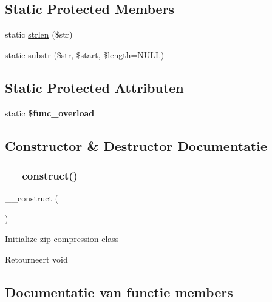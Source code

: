 \subsection*{Static Protected Members}
\begin{DoxyCompactItemize}
\item 
static \mbox{\hyperlink{class_c_i___zip_a4c29a687d4ed62c26a10e41d98930d5f}{strlen}} (\$str)
\item 
static \mbox{\hyperlink{class_c_i___zip_a101caef57ef0b165da5747e2c2e6c9dc}{substr}} (\$str, \$start, \$length=N\+U\+LL)
\end{DoxyCompactItemize}
\subsection*{Static Protected Attributen}
\begin{DoxyCompactItemize}
\item 
\mbox{\label{class_c_i___zip_aef84be58d58a5895572c5689e56a1047}} 
static {\bfseries \$func\+\_\+overload}
\end{DoxyCompactItemize}


\subsection{Constructor \& Destructor Documentatie}
\mbox{\label{class_c_i___zip_a095c5d389db211932136b53f25f39685}} 
\subsubsection{\texorpdfstring{\_\_construct()}{\_\_construct()}}
{\footnotesize\ttfamily \+\_\+\+\_\+construct (\begin{DoxyParamCaption}{ }\end{DoxyParamCaption})}

Initialize zip compression class

\begin{DoxyReturn}{Retourneert}
void 
\end{DoxyReturn}


\subsection{Documentatie van functie members}
\mbox{\label{class_c_i___zip_a4ff8a5ea57979ec1a44cc9e443acf26d}} 

